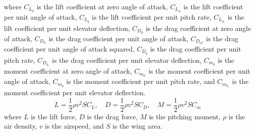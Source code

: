 \documentclass[journal,article,submit,pdftex,moreauthors]{Definitions/mdpi}
\begin{document}
where \(C_{L_0}\) is the lift coefficient at zero angle of attack, \(C_{L_\alpha}\) is the lift coefficient per unit angle of attack, \(C_{L_q}\) is the lift coefficient per unit pitch rate, \(C_{L_{\delta_e}}\) is the lift coefficient per unit elevator deflection, \(C_{D_0}\) is the drag coefficient at zero angle of attack, \(C_{D_\alpha}\) is the drag coefficient per unit angle of attack, \(C_{D_{\alpha^2}}\) is the drag coefficient per unit angle of attack squared, \(C_{D_q}\) is the drag coefficient per unit pitch rate, \(C_{D_{\delta_e}}\) is the drag coefficient per unit elevator deflection, \(C_{m_0}\) is the moment coefficient at zero angle of attack, \(C_{m_\alpha}\) is the moment coefficient per unit angle of attack, \(C_{m_q}\) is the moment coefficient per unit pitch rate, and \(C_{m_{\delta_e}}\) is the moment coefficient per unit elevator deflection.
\begin{equation}
    L = \frac{1}{2} \rho v^2 S C_L, \quad D = \frac{1}{2} \rho v^2 S C_D, \quad M = \frac{1}{2} \rho v^2 S C_m
\end{equation}
where \(L\) is the lift force, \(D\) is the drag force, \(M\) is the pitching moment, \(\rho\) is the air density, \(v\) is the airspeed, and \(S\) is the wing area.
\end{document}
